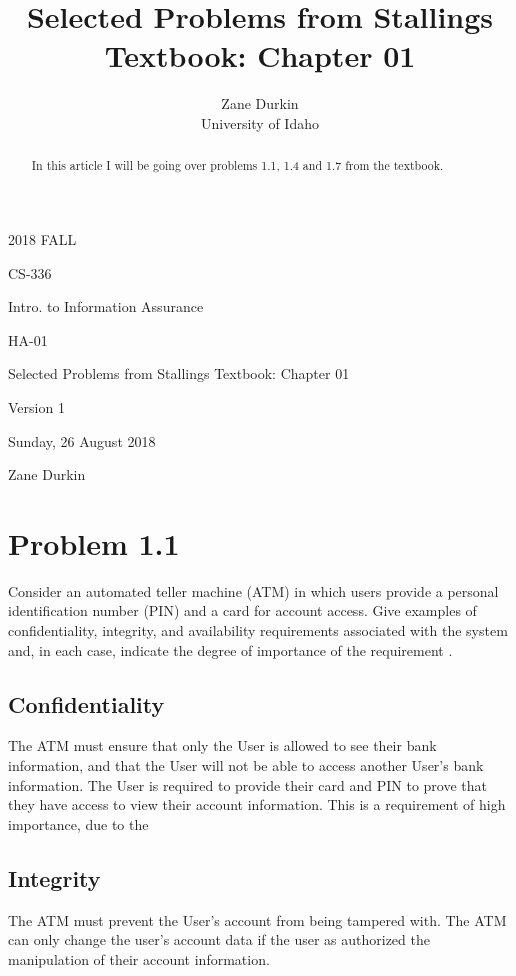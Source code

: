 \documentclass[12pt]{article}
\begin{document}
\title{Selected Problems from Stallings Textbook: Chapter 01}

\author{Zane Durkin\\
    University of Idaho}

\begin{description}[leftmargin=!, labelwidth=\widthof{\bfseries Author(s) Name(s)}]
\item [Year and Semester] 2018 FALL
\item [Course Number] CS-336
\item [Course Title] Intro. to Information Assurance
\item [Work Number] HA-01
\item [Work Name] Selected Problems from Stallings Textbook: Chapter 01
\item [Work Version] Version 1
\item [Long Date] Sunday, 26 August 2018
\item [Author(s) Name(s)] Zane Durkin
\end{description}


\begin{abstract}
In this article I will be going over problems 1.1, 1.4 and 1.7 from the textbook.
\end{abstract}

\section{Problem 1.1 \cite[p.~38]{stallings}}
Consider an automated teller machine (ATM) in which users provide a personal identification number (PIN) and a card for account access. Give examples of confidentiality, integrity, and availability requirements associated with the system and, in each case, indicate the degree of importance of the requirement \cite{stallings}.
\subsection{Confidentiality}
The ATM must ensure that only the User is allowed to see their bank information, and that the User will not be able to access another User's bank information. The User is required to provide their card and PIN to prove that they have access to view their account information. This is a requirement of high importance, due to the 
\subsection{Integrity}
The ATM must prevent the User's account from being tampered with. The ATM can only change the user's account data if the user as authorized the manipulation of their account information.
\end{document}
